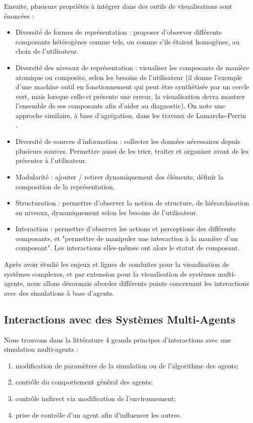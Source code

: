 		Ensuite, plusieurs propriétés à intégrer dans des outils de visualisations sont énoncées :
		\begin{itemize}
			\item Diversité de formes de représentation : proposer d'observer différents composants hétérogènes comme tels, ou comme s'ils étaient homogènes, au choix de l'utilisateur.
			\item Diversité des niveaux de représentation : visualiser les composants de manière atomique ou composite, selon les besoins de l'utilisateur (il donne l'exemple d'une machine outil en fonctionnement qui peut être synthétisée par un cercle vert, mais lorsque celle-ci présente une erreur, la visualisation devra montrer l'ensemble de ses composants afin d'aider au diagnostic). On note une approche similaire, à base d'agrégation, dans les travaux de Lamarche-Perrin \cite{lamarche-perrin_analyse_2013}.
			\item Diversité de sources d'information : collecter les données nécessaires depuis plusieurs sources. Permettre aussi de les trier, traiter et organiser avant de les présenter à l'utilisateur.
			\item Modularité : ajouter / retirer dynamiquement des éléments, définir la composition de la représentation.
			\item Structuration : permettre d'observer la notion de structure, de hiérarchisation en niveaux, dynamiquement selon les besoins de l'utilisateur.
			\item Interaction : permettre d'observer les actions et perceptions des différents composants, et "permettre de manipuler une interaction à la manière d'un composant". Les interactions elles-mêmes ont alors le statut de composant.
		\end{itemize}
		
		Après avoir étudié les enjeux et lignes de conduites pour la visualisation de systèmes complexes, et par extension pour la visualisation de systèmes multi-agents, nous allons désormais aborder différents points concernant les interactions avec des simulations à base d'agents.
		
		\subsection{Interactions avec des Systèmes Multi-Agents}
	
		Nous trouvons dans la littérature 4 grands principes d'interactions avec une simulation multi-agents \cite{kolling_human_2015} :
		\begin{enumerate}
			\item modification de paramètres de la simulation ou de l'algorithme des agents;
			\item contrôle du comportement général des agents;
			\item contrôle indirect via modification de l'environnement;
			\item prise de contrôle d'un agent afin d'influencer les autres.
		\end{enumerate}
		
